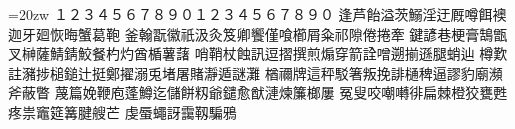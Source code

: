 \documentclass[uplatex]{jsarticle}
\begin{document}
\LARGE
\vbox{\hsize=20zw\noindent\kanjiskip=0pt
１２３４５６７８９０１２３４５６７８９０
逢芦飴溢茨鰯淫迂厩噂餌襖迦牙廻恢晦蟹葛鞄
釜翰翫徽祇汲灸笈卿饗僅喰櫛屑粂祁隙倦捲牽
鍵諺巷梗膏鵠甑叉榊薩鯖錆鮫餐杓灼酋楯薯藷
哨鞘杖蝕訊逗摺撰煎煽穿箭詮噌遡揃遜腿蛸辿
樽歎註瀦捗槌鎚辻挺鄭擢溺兎堵屠賭瀞遁謎灘
楢禰牌這秤駁箸叛挽誹樋稗逼謬豹廟瀕斧蔽瞥
蔑篇娩鞭庖蓬鱒迄儲餅籾爺鑓愈猷漣煉簾榔屢
冤叟咬嘲囀徘扁棘橙狡甕甦疼祟竈筵篝腱艘芒
虔蜃蠅訝靄靱騙鴉}
\end{document}
